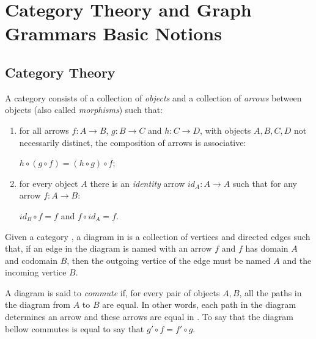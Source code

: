 \chapter{Category Theory and Graph Grammars Basic Notions}\label{ch:gts}

\section{Category Theory}

\begin{definition}[Category] A category  consists of a collection of \emph{objects} and a collection of \emph{arrows} between objects (also called \emph{morphisms}) such that:

  \begin{enumerate}
    \item for all arrows $f : A \rightarrow B$, $g : B \rightarrow C$ and
$h : C \rightarrow D$, with objects $A,B,C,D$ not necessarily distinct, the composition of arrows is associative:

  $h \circ (g \circ f) = (h \circ g) \circ f$;
    \item for every object $A$ there is an \emph{identity} arrow $id_A : A \rightarrow A$ such that for any arrow $f : A \rightarrow B$:

  $id_B \circ f = f$ and $f \circ id_A = f$.
  \end{enumerate}

\end{definition}

\begin{example}
\end{example}

\begin{definition}[Diagram] Given a category , a diagram in  is a collection of vertices and directed edges such that, if an edge in the diagram is named with an arrow $f$ and $f$ has domain $A$ and codomain $B$, then the outgoing vertice of the edge must be named $A$ and the incoming vertice $B$.

  A diagram is said to \emph{commute} if, for every pair of objects $A,B$, all the paths in the diagram from $A$ to $B$ are equal. In other words, each path in the diagram determines an arrow and these arrows are equal in . To say that the diagram bellow commutes is equal to say that \mbox{$g' \circ f = f' \circ g$}.


\end{definition}

